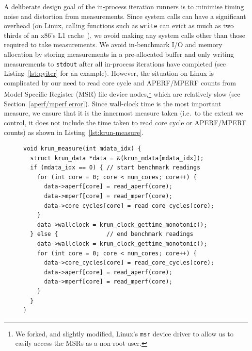 \documentclass[acmlarge]{acmart}\settopmatter{printfolios=true}
\begin{document}
A deliberate design goal of the in-process iteration runners is to minimise
timing noise and distortion from measurements. Since system calls can have a
significant overhead (on Linux, calling functions such as \texttt{write} can
evict as much as two thirds of an x86's L1 cache~\cite{soares10flexsc}), we
avoid making any system calls other than those required to take measurements. We
avoid in-benchmark I/O and memory allocation by storing measurements in a
pre-allocated buffer and only writing measurements to \texttt{stdout} after all
in-process iterations have completed (see Listing~\ref{lst:pyiter} for an
example). However, the situation on Linux is complicated by our need to read
core cycle and APERF/MPERF counts from Model Specific Register (MSR) file device
nodes,\footnote{We forked, and slightly modified, Linux's \texttt{msr} device
driver to allow us to easily access the MSRs as a non-root user.} which are relatively
slow (see Section~\ref{aperf/mperf error}). Since wall-clock time
is the most important measure, we ensure that it is the innermost measure taken
(i.e.~to the extent we control, it does not include the time taken to read
core cycle or APERF/MPERF counts) as shown in Listing~\ref{lst:krun-measure}.

\begin{figure}[t]
\begin{lstlisting}[label=lst:krun-measure, xleftmargin=0cm,
        caption={%
\texttt{krun\_measure}: Measuring before (the \texttt{if} true branch) and
after (the false branch) a benchmark. Since
wall-clock time is the most important measure, it is innermost; since
the APERF/MPERF counters are a sanity check, they are outermost. Note that
the APERF/MPERF counters must be read in the same order before
and after a benchmark.}]
void krun_measure(int mdata_idx) {
  struct krun_data *data = &(krun_mdata[mdata_idx]);
  if (mdata_idx == 0) { // start benchmark readings
    for (int core = 0; core < num_cores; core++) {
      data->aperf[core] = read_aperf(core);
      data->mperf[core] = read_mperf(core);
      data->core_cycles[core] = read_core_cycles(core);
    }
    data->wallclock = krun_clock_gettime_monotonic();
  } else {              // end benchmark readings
    data->wallclock = krun_clock_gettime_monotonic();
    for (int core = 0; core < num_cores; core++) {
      data->core_cycles[core] = read_core_cycles(core);
      data->aperf[core] = read_aperf(core);
      data->mperf[core] = read_mperf(core);
    }
  }
}
\end{lstlisting}
\end{figure}
\end{document}
